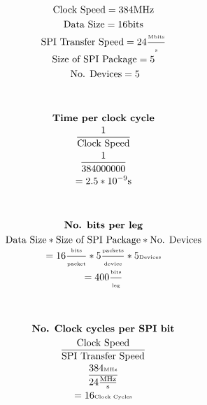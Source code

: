        \begin{figure}[!t]
        \begin{minipage}{0.5\textwidth}
            \begin{gather*}
                \text{Clock Speed} = 384 \text{MHz}\\
                \text{Data Size} = 16 \text{bits}\\
                \text{SPI Transfer Speed} = 24 \tiny{\frac{\text{Mbits}}{\text{s}}}\\
                \text{Size of SPI Package}= 5\\
                \text{ No. Devices} = 5\\
                \\
                \\
                \textbf{Time per clock cycle}\\
                \frac{1}{\text{Clock Speed}}\\
                \frac{1}{384000000}\\
                = 2.5*10^{-9}\text{s}\\
                \\
                \\
                \textbf{No. bits per leg}\\
                \text{Data Size} * \text{Size of SPI Package} * \text{No. Devices}\\
                = 16 \tiny{\frac{\text{bits}}{\tiny{\text{packet}}}} * 5\frac{\text{packets}}{\text{device}} * 5\text{Devices} \\
                = 400 \tiny{\frac{\text{bits}}{\text{leg}}}\\
                \\
                \\
            \end{gather*} 
        \end{minipage}
        \begin{minipage}{0.5\textwidth}
            \begin{gather*} 
                \textbf{No. Clock cycles per SPI bit}\\
                \frac{\text{Clock Speed}}{\text{SPI	Transfer Speed}}\\
                \tiny{\frac{384\text{MHz}}{24\frac{\text{MHz}}{\text{s}}}}\\ 
                =16\tiny{\text{Clock Cycles}}\\
                \\

\end{gather*}
\end{minipage}
\end{figure}
